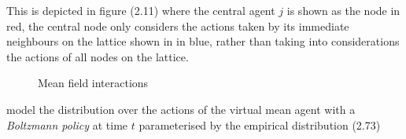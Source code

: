 This is depicted in figure (2.11) where the central agent $j$ is shown as the node in red, the central node
only considers the actions taken by its immediate neighbours on the lattice shown in in blue, rather than 
taking into considerations the actions of all nodes on the lattice.
\begin{figure}[!htb]
    \begin{center}
        \caption{Mean field interactions}
    \end{center}
\end{figure}
\cite{Yang2018} model the distribution over the actions of the virtual mean agent
with a \emph{Boltzmann policy} at time $t$ parameterised by the empirical distribution (2.73)

